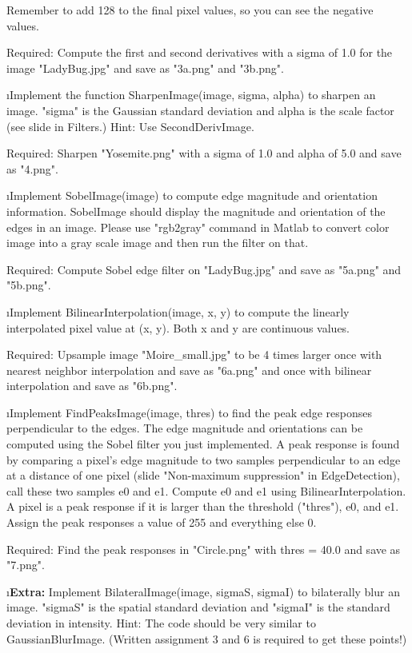 \documentclass[fleqn]{article}
\begin{document}
Remember to add 128 to the final pixel values, so you can see the negative values.
 
Required: Compute the first and second derivatives with a sigma of 1.0 for the image "LadyBug.jpg" and save as "3a.png" and "3b.png".
 
\i Implement the function SharpenImage(image, sigma, alpha) to sharpen an image. "sigma" is the Gaussian standard deviation and alpha is the scale factor (see slide in Filters.) Hint: Use SecondDerivImage.
 
Required: Sharpen "Yosemite.png" with a sigma of 1.0 and alpha of 5.0 and save as "4.png".
 
\i Implement SobelImage(image) to compute edge magnitude and orientation information. SobelImage should display the magnitude and orientation of the edges in an image. Please use "rgb2gray" command in Matlab to convert color image into a gray scale image and then run the filter on that.

Required: Compute Sobel edge filter on "LadyBug.jpg" and save as "5a.png" and "5b.png".
 
\i Implement BilinearInterpolation(image, x, y) to compute the linearly interpolated pixel value at (x, y). Both x and y are continuous values.

Required: Upsample image "Moire\_small.jpg" to be 4 times larger once with nearest neighbor interpolation and save as "6a.png" and once with bilinear interpolation and save as "6b.png".
 
\i Implement FindPeaksImage(image, thres) to find the peak edge responses perpendicular to the edges. The edge magnitude and orientations can be computed using the Sobel filter you just implemented. A peak response is found by comparing a pixel's edge magnitude to two samples perpendicular to an edge at a distance of one pixel (slide "Non-maximum suppression" in EdgeDetection), call these two samples e0 and e1. Compute e0 and e1 using BilinearInterpolation. A pixel is a peak response if it is larger than the threshold ("thres"), e0, and e1. Assign the peak responses a value of 255 and everything else 0.
 
Required: Find the peak responses in "Circle.png" with thres = 40.0 and save as "7.png".
  
\i {\bf Extra:} Implement BilateralImage(image, sigmaS, sigmaI) to bilaterally blur an image. "sigmaS" is the spatial standard deviation and "sigmaI" is the standard deviation in intensity. Hint: The code should be very similar to GaussianBlurImage. (Written assignment 3 and 6 is required to get these points!)
 
\end{document}
